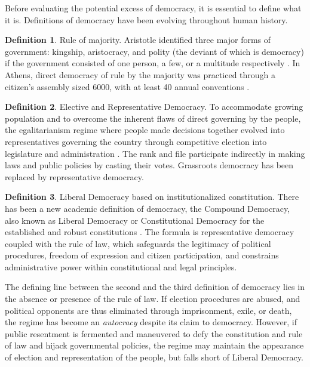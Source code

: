 \documentclass{scrartcl}
\theoremstyle{definition}
\newtheorem{definition}{Definition}
\begin{document}
Before evaluating the potential excess of democracy, it is essential to define what it is. Definitions of democracy have been evolving throughout human history. 

\begin{definition}
	Rule of majority.
Aristotle identified three major forms of government: kingship, aristocracy, and polity (the deviant of which is democracy) if the government consisted of one person, a few, or a multitude respectively \autocite{arispol}. In Athens, direct democracy of rule by the majority was practiced through a citizen's assembly sized 6000, with at least 40 annual conventions \autocite{Bao2018}. 
\end{definition}

\begin{definition}
	Elective and Representative Democracy.
To accommodate growing population and to overcome the inherent flaws of direct governing by the people, the egalitarianism regime where people made decisions together evolved into representatives governing the country through competitive election into legislature and administration \autocite{capsocdem}. The rank and file participate indirectly in making laws and public policies by casting their votes. Grassroots democracy has been replaced by representative democracy. 
\end{definition}

\begin{definition}
	Liberal Democracy based on institutionalized constitution.
There has been a new academic definition of democracy, the Compound Democracy, also known as Liberal Democracy or Constitutional Democracy for the established and robust constitutions \autocite{Bao2018}. The formula is representative democracy coupled with the rule of law, which safeguards the legitimacy of political procedures, freedom of expression and citizen participation, and constrains administrative power within constitutional and legal principles. 
\end{definition}

The defining line between the second and the third definition of democracy lies in the absence or presence of the rule of law. If election procedures are abused, and political opponents are thus eliminated through imprisonment, exile, or death, the regime has become an \emph{autocracy} despite its claim to democracy. However, if public resentment is fermented and maneuvered to defy the constitution and rule of law and hijack governmental policies, the regime may maintain the appearance of election and representation of the people, but falls short of Liberal Democracy. 
\end{document}
